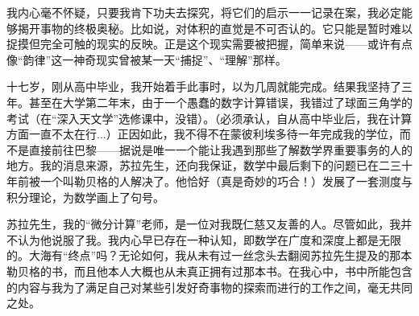 我内心毫不怀疑，只要我肯下功夫去探究，将它们的启示一一记录在案，我必定能够揭开事物的终极奥秘。比如说，对体积的直觉是不可否认的。它只能是暂时难以捉摸但完全可触的现实的反映。正是这个现实需要被把握，简单来说——或许有点像“韵律”这一神奇现实曾被某一天“捕捉”、“理解”那样。

十七岁，刚从高中毕业，我开始着手此事时，以为几周就能完成。结果我坚持了三年。甚至在大学第二年末，由于一个愚蠢的数字计算错误，我错过了球面三角学的考试（在“深入天文学”选修课中，没错）。（必须承认，自从高中毕业后，我在计算方面一直不太在行...）正因如此，我不得不在蒙彼利埃多待一年完成我的学位，而不是直接前往巴黎——据说是唯一一个能让我遇到那些了解数学界重要事务的人的地方。我的消息来源，苏拉先生，还向我保证，数学中最后剩下的问题已在二三十年前被一个叫勒贝格的人解决了。他恰好（真是奇妙的巧合！）发展了一套测度与积分理论，为数学画上了句号。


苏拉先生，我的“微分计算”老师，是一位对我既仁慈又友善的人。尽管如此，我并不认为他说服了我。我内心早已存在一种认知，即数学在广度和深度上都是无限的。大海有“终点”吗？无论如何，我从未有过一丝念头去翻阅苏拉先生提及的那本勒贝格的书，而且他本人大概也从未真正拥有过那本书。在我心中，书中所能包含的内容与我为了满足自己对某些引发好奇事物的探索而进行的工作之间，毫无共同之处。